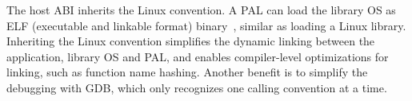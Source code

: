 

The host ABI inherits the \graphenearch{} Linux convention. %
A PAL can load the library OS as ELF (executable and linkable format) binary~\cite{elf-format}, similar as loading a Linux library.
Inheriting the \graphenesgx{} Linux convention
simplifies the dynamic linking between the application, library OS and PAL,
and enables compiler-level optimizations for linking,
such as function name hashing.
Another benefit is to simplify the debugging with GDB, which only recognizes one calling convention at a time.








